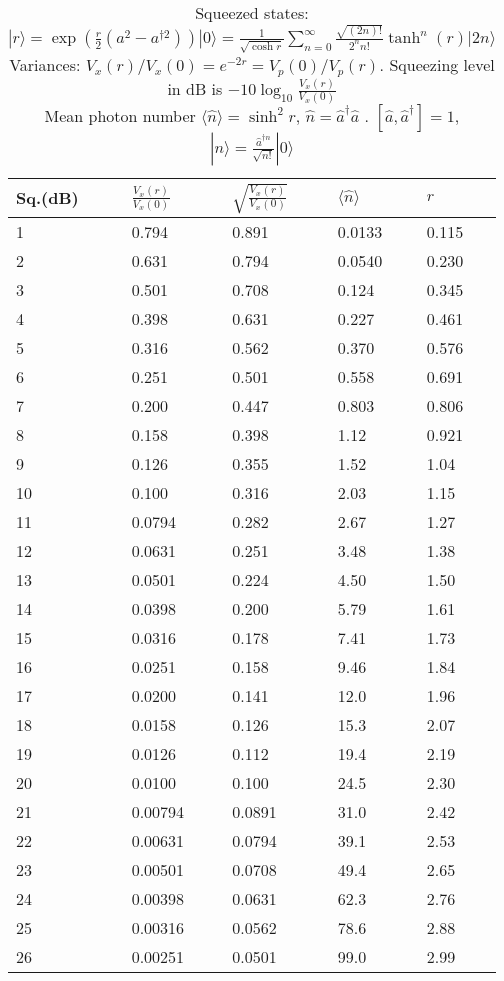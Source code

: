 \documentclass[12pt,letterpaper]{article}
\newcommand{\ket}[1]{| #1 \rangle}
\begin{document}

\begin{table}[!h]
\centering
{\Large
\begin{tabular}{lllll}
\hline
Sq.(dB) & ${\frac{V_x(r)}{V_x(0)}}$ & $\sqrt{\frac{V_x(r)}{V_x(0)}}$ & $\langle \hat n \rangle$ & $r$ \\
\hline
\hline
 1 & 0.794 & 0.891 & 0.0133 & 0.115 \\
 2 & 0.631 & 0.794 & 0.0540 & 0.230 \\
 3 & 0.501 & 0.708 & 0.124 & 0.345 \\
 4 & 0.398 & 0.631 & 0.227 & 0.461 \\
 5 & 0.316 & 0.562 & 0.370 & 0.576 \\
 6 & 0.251 & 0.501 & 0.558 & 0.691 \\
 7 & 0.200 & 0.447 & 0.803 & 0.806 \\
 8 & 0.158 & 0.398 & 1.12 & 0.921 \\
 9 & 0.126 & 0.355 & 1.52 & 1.04 \\
 10 & 0.100 & 0.316 & 2.03 & 1.15 \\
 11 & 0.0794 & 0.282 & 2.67 & 1.27 \\
 12 & 0.0631 & 0.251 & 3.48 & 1.38 \\
 13 & 0.0501 & 0.224 & 4.50 & 1.50 \\
 14 & 0.0398 & 0.200 & 5.79 & 1.61 \\
 15 & 0.0316 & 0.178 & 7.41 & 1.73 \\
 16 & 0.0251 & 0.158 & 9.46 & 1.84 \\
 17 & 0.0200 & 0.141 & 12.0 & 1.96 \\
 18 & 0.0158 & 0.126 & 15.3 & 2.07 \\
 19 & 0.0126 & 0.112 & 19.4 & 2.19 \\
 20 & 0.0100 & 0.100 & 24.5 & 2.30 \\
 21 & 0.00794 & 0.0891 & 31.0 & 2.42 \\
 22 & 0.00631 & 0.0794 & 39.1 & 2.53 \\
 23 & 0.00501 & 0.0708 & 49.4 & 2.65 \\
 24 & 0.00398 & 0.0631 & 62.3 & 2.76 \\
 25 & 0.00316 & 0.0562 & 78.6 & 2.88 \\
 26 & 0.00251 & 0.0501 & 99.0 & 2.99 \\
\hline
\end{tabular}
}
\caption{ Squeezed states:
$\ket{r} =\exp\left(\frac{r}{2} (a^2 - a^{\dagger 2}) \right)\ket{0} = \frac{1}{\sqrt{\cosh{r}}} \sum_{n=0}^\infty \frac{\sqrt{(2n)!}}{2^n n!} \tanh^n(r) \ket{2n}$ \\
Variances: $V_x(r)/V_x(0) = e^{-2r} = V_p(0)/V_p(r)$.  Squeezing level in dB is $-10 \log_{10} \frac{V_x(r)}{V_x(0)}$ \\
Mean photon number $\langle \hat n \rangle  = \sinh^2 r$, $\hat n =\hat a^\dagger \hat a$ . $[\hat a,\hat a^\dagger] =1$, $\ket{n} = \frac{\hat a^{\dagger n}}{\sqrt{n!}} \ket{0}$}
\end{table}
\end{document}

